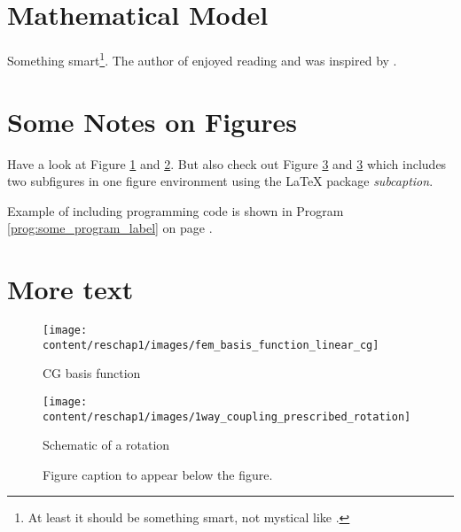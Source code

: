 \section{Mathematical Model}
Something smart\footnote{At least it should be something smart, not mystical like \cite{ExampleArticle1984}.}. The author of \cite{EmmitBrown1955} enjoyed reading and was inspired by \cite{TwentyThousandLeaguesUnderTheSea}.

\section{Some Notes on Figures}
Have a look at Figure \ref{fig:basis_fun_cg} and \ref{fig:rotation_schematic}. But also check out Figure \ref{fig:basis_functions} and \ref{fig:basis_functions} which includes two subfigures in one figure environment using the \LaTeX{} package \textsl{subcaption}.

Example of including programming code is shown in Program \ref{prog:some_program_label} on page \pageref{prog:some_program_label}.

\section{More text}
\blindtext

\begin{figure}[p]
 \centering
 \texttt{[image: content/reschap1/images/fem\_basis\_function\_linear\_cg]}
 \caption[Basis function]{CG basis function}
 \label{fig:basis_fun_cg}
\end{figure}

\begin{figure}[p]
 \centering
 \texttt{[image: content/reschap1/images/1way\_coupling\_prescribed\_rotation]}
 \caption[Schematic]{Schematic of a rotation}
 \label{fig:rotation_schematic}
\end{figure}

\begin{figure}[p!]
 \centering
 \captionsetup[sub]{skip=0ex}
 \hfill
%
 \caption[Figure caption to appear in \textsl{List of Figures}]{Figure caption to appear below the figure.}
 \label{fig:basis_functions}
\end{figure}

\clearpage
\begin{program}[p]

\end{program}
